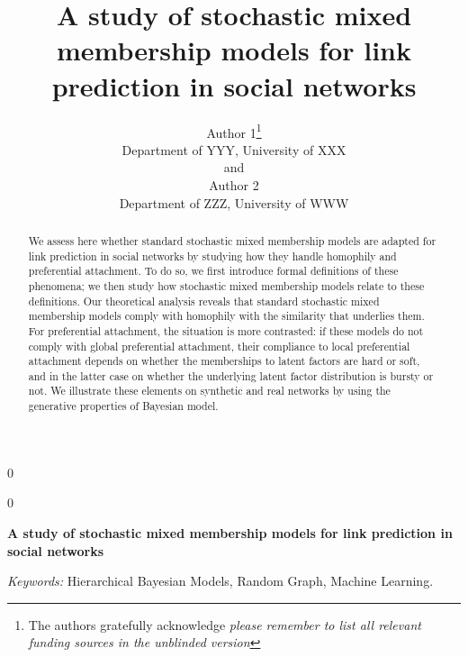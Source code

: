 \documentclass[12pt]{article}
\newcommand{\blind}{0}
\begin{document}
\def\spacingset#1{\renewcommand{\baselinestretch}%
{#1}\small\normalsize} \spacingset{1}



\blind
{
  \title{\bf A study of stochastic mixed membership models for link prediction in social networks}
  \author{Author 1\thanks{
    The authors gratefully acknowledge \textit{please remember to list all relevant funding sources in the unblinded version}}\hspace{.2cm}\\
    Department of YYY, University of XXX\\
    and \\
    Author 2 \\
    Department of ZZZ, University of WWW}
  \maketitle
} \fi

\blind
{
  \bigskip
  \bigskip
  \bigskip
  \begin{center}
    {\LARGE\bf A study of stochastic mixed membership models for link prediction in social networks}
\end{center}
  \medskip
} \fi

\bigskip
\begin{abstract}
We assess here whether standard stochastic mixed membership models are adapted for link prediction in social networks by studying how they handle homophily and preferential attachment. To do so, we first introduce formal definitions of these phenomena; we then study how stochastic mixed membership models relate to these definitions. Our theoretical analysis reveals that standard stochastic mixed membership models comply with homophily with the similarity that underlies them. For preferential attachment, the situation is more contrasted: if these models do not comply with global preferential attachment, their compliance to local preferential attachment depends on whether the memberships to latent factors are hard or soft, and in the latter case on whether the underlying latent factor distribution is bursty or not. We illustrate these elements on synthetic and real networks by using the generative properties of Bayesian model.
\end{abstract}

\noindent%
{\it Keywords:}  Hierarchical Bayesian Models, Random Graph, Machine Learning.
\vfill
\end{document}
